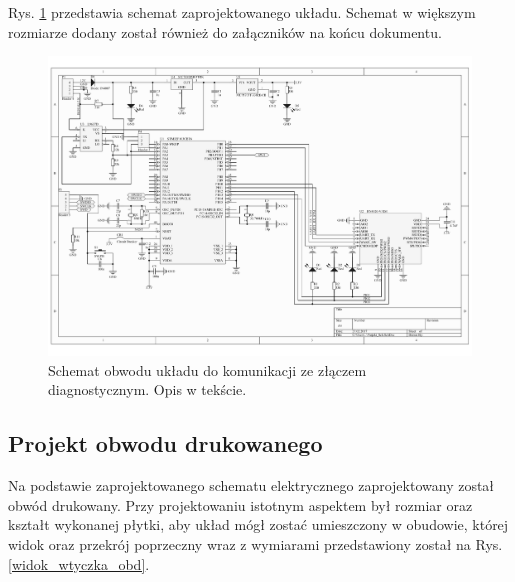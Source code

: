 \documentclass[12pt]{article} %
\numberwithin{equation}{subsection}
\numberwithin{figure}{section}
\numberwithin{table}{section}
\begin{document}
		Rys. \ref{rys_schemat_ukladu_elektrycznego} przedstawia schemat zaprojektowanego układu. Schemat w większym rozmiarze dodany został również do załączników na końcu dokumentu.
		
		\begin{figure}[!h]
			\centering
			\includegraphics[scale=0.6, angle=90]{Images/SchematUkladuElektrycznego.pdf}
			\caption{Schemat obwodu układu do komunikacji ze złączem diagnostycznym. Opis w tekście.}
			\label{rys_schemat_ukladu_elektrycznego}
		\end{figure}
	
		\newpage
	
	\subsection{Projekt obwodu drukowanego}
		\hspace{0.5cm}Na podstawie zaprojektowanego schematu elektrycznego zaprojektowany został obwód drukowany. Przy projektowaniu istotnym aspektem był rozmiar oraz kształt wykonanej płytki, aby układ mógł zostać umieszczony w obudowie, której widok oraz przekrój poprzeczny wraz z wymiarami przedstawiony został na Rys. \ref{widok_wtyczka_obd}.
		
\end{document}
